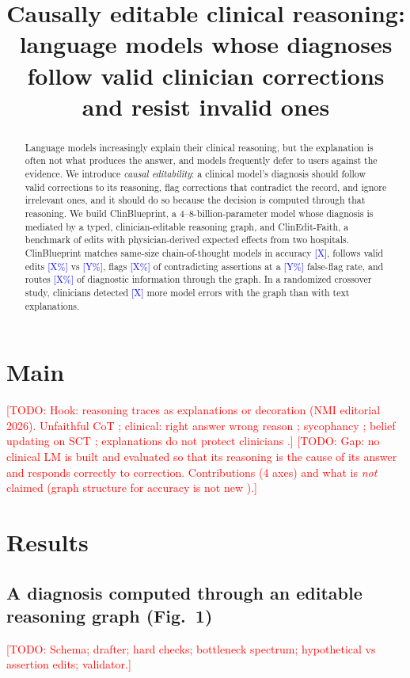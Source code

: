 \documentclass[11pt]{article}
\title{Causally editable clinical reasoning: language models whose diagnoses follow valid clinician corrections and resist invalid ones}
\author{\todo{authors and affiliations}}
\date{}
\newcommand{\todo}[1]{\textcolor{red}{[TODO: #1]}}
\newcommand{\res}[1]{\textcolor{blue}{[#1]}}
\begin{document}
\maketitle

\begin{abstract}
Language models increasingly explain their clinical reasoning, but the explanation is often not what produces the answer, and models frequently defer to users against the evidence. We introduce \emph{causal editability}: a clinical model's diagnosis should follow valid corrections to its reasoning, flag corrections that contradict the record, and ignore irrelevant ones, and it should do so because the decision is computed through that reasoning. We build ClinBlueprint, a 4--8-billion-parameter model whose diagnosis is mediated by a typed, clinician-editable reasoning graph, and ClinEdit-Faith, a benchmark of edits with physician-derived expected effects from two hospitals. ClinBlueprint matches same-size chain-of-thought models in accuracy \res{X}, follows valid edits \res{X\%} vs \res{Y\%}, flags \res{X\%} of contradicting assertions at a \res{Y\%} false-flag rate, and routes \res{X\%} of diagnostic information through the graph. In a randomized crossover study, clinicians detected \res{X} more model errors with the graph than with text explanations.
\end{abstract}

\section*{Main}
\todo{Hook: reasoning traces as explanations or decoration (NMI editorial 2026). Unfaithful CoT \cite{turpin2023,lanham2023,chen2025reasoning}; clinical: right answer wrong reason \cite{rawr2026}; sycophancy \cite{sycophancy_npjdm2025,sycophancy_aim2026}; belief updating on SCT \cite{mccoy2025sct}; explanations do not protect clinicians \cite{jabbour2023,goh2024,qazi_nejmai}.}
\todo{Gap: no clinical LM is built and evaluated so that its reasoning is the cause of its answer and responds correctly to correction. Contributions (4 axes) and what is \emph{not} claimed (graph structure for accuracy is not new \cite{direct2024}).}

\section*{Results}
\subsection*{A diagnosis computed through an editable reasoning graph (Fig.~1)}
\todo{Schema; drafter; hard checks; bottleneck spectrum; hypothetical vs assertion edits; validator.}
\end{document}
